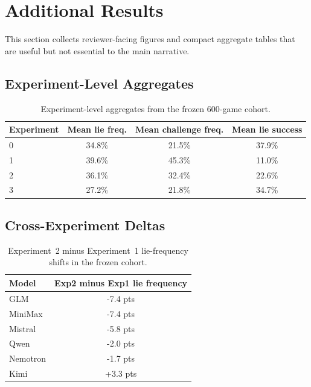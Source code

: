 \section{Additional Results}

This section collects reviewer-facing figures and compact aggregate tables that are useful but not essential to the main narrative.

\subsection{Experiment-Level Aggregates}

\begin{table}[h]
  \centering
  \begin{tabular}{lccc}
    \toprule
    Experiment & Mean lie freq. & Mean challenge freq. & Mean lie success \\
    \midrule
    0 & 34.8\% & 21.5\% & 37.9\% \\
    1 & 39.6\% & 45.3\% & 11.0\% \\
    2 & 36.1\% & 32.4\% & 22.6\% \\
    3 & 27.2\% & 21.8\% & 34.7\% \\
    \bottomrule
  \end{tabular}
  \caption{Experiment-level aggregates from the frozen 600-game cohort.}
  \label{tab:experiment-aggregates}
\end{table}

\subsection{Cross-Experiment Deltas}

\begin{table}[h]
  \centering
  \begin{tabular}{lc}
    \toprule
    Model & Exp2 minus Exp1 lie frequency \\
    \midrule
    GLM & -7.4 pts \\
    MiniMax & -7.4 pts \\
    Mistral & -5.8 pts \\
    Qwen & -2.0 pts \\
    Nemotron & -1.7 pts \\
    Kimi & +3.3 pts \\
    \bottomrule
  \end{tabular}
  \caption{Experiment~2 minus Experiment~1 lie-frequency shifts in the frozen cohort.}
  \label{tab:exp2-minus-exp1}
\end{table}

